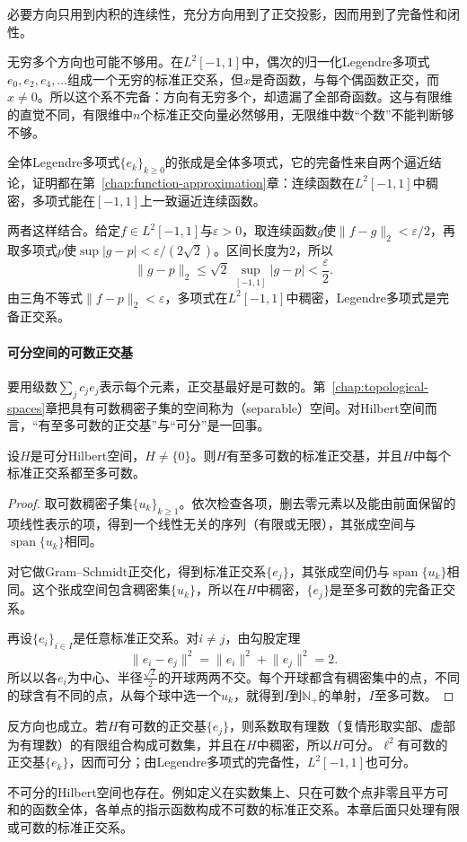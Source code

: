 必要方向只用到内积的连续性，充分方向用到了正交投影，因而用到了完备性和闭性。

无穷多个方向也可能不够用。在$L^2[-1,1]$中，偶次的归一化Legendre多项式$e_0,e_2,e_4,\ldots$组成一个无穷的标准正交系，但$x$是奇函数，与每个偶函数正交，而$x\neq0$。所以这个系不完备：方向有无穷多个，却遗漏了全部奇函数。这与有限维的直觉不同，有限维中$n$个标准正交向量必然够用，无限维中数“个数”不能判断够不够。

全体Legendre多项式$\{e_k\}_{k\geq0}$的张成是全体多项式，它的完备性来自两个逼近结论，证明都在第~\ref{chap:function-approximation}章：连续函数在$L^2[-1,1]$中稠密，多项式能在$[-1,1]$上一致逼近连续函数。

两者这样结合。给定$f\in L^2[-1,1]$与$\varepsilon>0$，取连续函数$g$使$\lVert f-g\rVert_2<\varepsilon/2$，再取多项式$p$使$\sup\lvert g-p\rvert<\varepsilon/(2\sqrt2)$。区间长度为$2$，所以
\[
 \lVert g-p\rVert_2\leq\sqrt2\,\sup_{[-1,1]}\lvert g-p\rvert<\frac\varepsilon2 .
\]
由三角不等式$\lVert f-p\rVert_2<\varepsilon$，多项式在$L^2[-1,1]$中稠密，Legendre多项式是完备正交系。

\paragraph{可分空间的可数正交基}
要用级数$\sum_jc_je_j$表示每个元素，正交基最好是可数的。第~\ref{chap:topological-spaces}章把具有可数稠密子集的空间称为（separable）空间。对Hilbert空间而言，“有至多可数的正交基”与“可分”是一回事。

\begin{theorem}[可分Hilbert空间的正交基]
\label{thm:ipspace-separable-basis}
设$H$是可分Hilbert空间，$H\neq\{0\}$。则$H$有至多可数的标准正交基，并且$H$中每个标准正交系都至多可数。
\end{theorem}

\begin{proof}
取可数稠密子集$\{u_k\}_{k\geq1}$。依次检查各项，删去零元素以及能由前面保留的项线性表示的项，得到一个线性无关的序列（有限或无限），其张成空间与$\operatorname{span}\{u_k\}$相同。

对它做Gram--Schmidt正交化，得到标准正交系$\{e_j\}$，其张成空间仍与$\operatorname{span}\{u_k\}$相同。这个张成空间包含稠密集$\{u_k\}$，所以在$H$中稠密，$\{e_j\}$是至多可数的完备正交系。

再设$\{e_i\}_{i\in I}$是任意标准正交系。对$i\neq j$，由勾股定理
\[
 \lVert e_i-e_j\rVert^2=\lVert e_i\rVert^2+\lVert e_j\rVert^2=2 .
\]
所以以各$e_i$为中心、半径$\tfrac{\sqrt2}2$的开球两两不交。每个开球都含有稠密集中的点，不同的球含有不同的点，从每个球中选一个$u_k$，就得到$I$到$\mathbb N_+$的单射，$I$至多可数。
\end{proof}

反方向也成立。若$H$有可数的正交基$\{e_j\}$，则系数取有理数（复情形取实部、虚部为有理数）的有限组合构成可数集，并且在$H$中稠密，所以$H$可分。$\ell^2$有可数的正交基$\{e_k\}$，因而可分；由Legendre多项式的完备性，$L^2[-1,1]$也可分。

不可分的Hilbert空间也存在。例如定义在实数集上、只在可数个点非零且平方可和的函数全体，各单点的指示函数构成不可数的标准正交系。本章后面只处理有限或可数的标准正交系。

